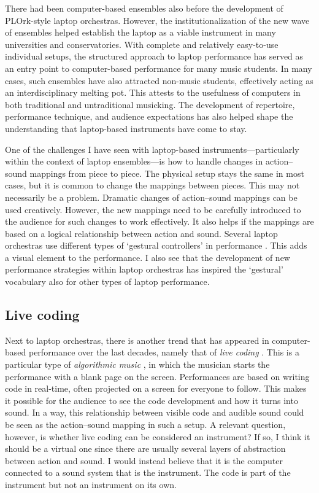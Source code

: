 There had been computer-based ensembles also before the development of PLOrk-style laptop orchestras. However, the institutionalization of the new wave of ensembles helped establish the laptop as a viable instrument in many universities and conservatories. With complete and relatively easy-to-use individual setups, the structured approach to laptop performance has served as an entry point to computer-based performance for many music students. In many cases, such ensembles have also attracted non-music students, effectively acting as an interdisciplinary melting pot. This attests to the usefulness of computers in both traditional and untraditional musicking. The development of repertoire, performance technique, and audience expectations has also helped shape the understanding that laptop-based instruments have come to stay.

One of the challenges I have seen with laptop-based instruments---particularly within the context of laptop ensembles---is how to handle changes in action--sound mappings from piece to piece. The physical setup stays the same in most cases, but it is common to change the mappings between pieces. This may not necessarily be a problem. Dramatic changes of action--sound mappings can be used creatively. However, the new mappings need to be carefully introduced to the audience for such changes to work effectively. It also helps if the mappings are based on a logical relationship between action and sound. Several laptop orchestras use different types of `gestural controllers' in performance \citep{tsoukalas_l2orkmote_2018}. This adds a visual element to the performance. I also see that the development of new performance strategies within laptop orchestras has inspired the `gestural' vocabulary also for other types of laptop performance.


\subsection{Live coding}

Next to laptop orchestras, there is another trend that has appeared in computer-based performance over the last decades, namely that of \emph{live coding} \citep{collins_live_2003}. This is a particular type of \emph{algorithmic music} \citep{dean_oxford_2018}, in which the musician starts the performance with a blank page on the screen. Performances are based on writing code in real-time, often projected on a screen for everyone to follow. This makes it possible for the audience to see the code development and how it turns into sound. In a way, this relationship between visible code and audible sound could be seen as the action--sound mapping in such a setup. A relevant question, however, is whether live coding can be considered an instrument? If so, I think it should be a virtual one since there are usually several layers of abstraction between action and sound. I would instead believe that it is the computer connected to a sound system that is the instrument. The code is part of the instrument but not an instrument on its own.

